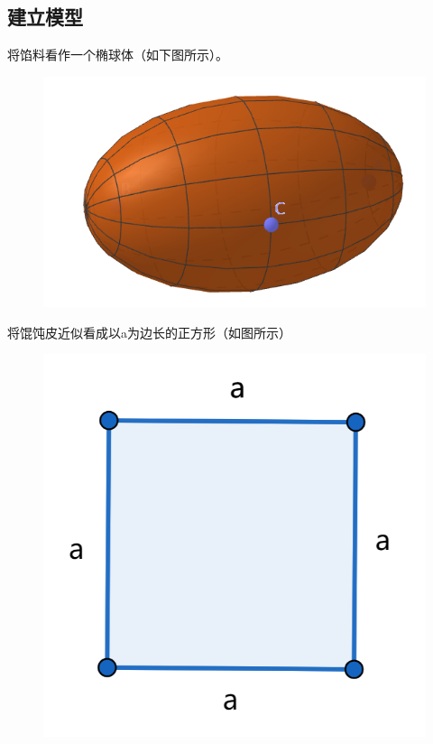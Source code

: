 \documentclass[lang=cn,a4paper]{elegantpaper}
\begin{document}
    \subsection{建立模型}
    将馅料看作一个椭球体（如下图所示）。
    \begin{figure}[H]
        \centering
        \includegraphics[scale=0.2]{ellipsoids.png}
    \end{figure}
    将馄饨皮近似看成以a为边长的正方形（如图所示）
    \begin{figure}[H]
        \centering
        \includegraphics[scale=0.5]{square.png}
    \end{figure}
\end{document}
